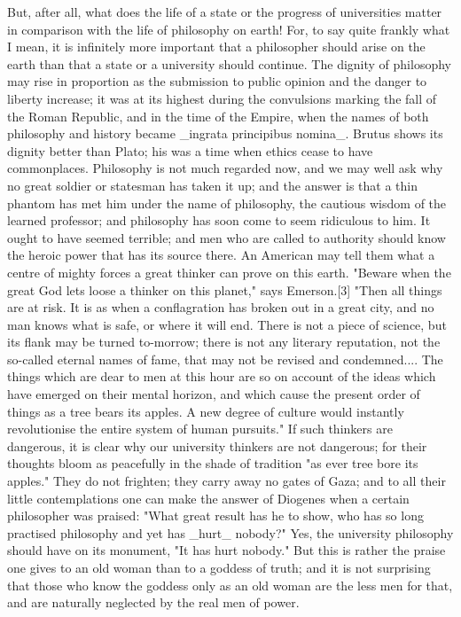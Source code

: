 But, after all, what does the life of a state or the progress of
universities matter in comparison with the life of philosophy on
earth! For, to say quite frankly what I mean, it is infinitely more
important that a philosopher should arise on the earth than that a
state or a university should continue. The dignity of philosophy may
rise in proportion as the submission to public opinion and the danger
to liberty increase; it was at its highest during the convulsions
marking the fall of the Roman Republic, and in the time of the
Empire, when the names of both philosophy and history became _ingrata
principibus nomina_. Brutus shows its dignity better than Plato; his
was a time when ethics cease to have commonplaces. Philosophy is not
much regarded now, and we may well ask why no great soldier or
statesman has taken it up; and the answer is that a thin phantom has
met him under the name of philosophy, the cautious wisdom of the
learned professor; and philosophy has soon come to seem ridiculous to
him. It ought to have seemed terrible; and men who are called to
authority should know the heroic power that has its source there. An
American may tell them what a centre of mighty forces a great thinker
can prove on this earth. "Beware when the great God lets loose a
thinker on this planet," says Emerson.[3] "Then all things are at
risk. It is as when a conflagration has broken out in a great city,
and no man knows what is safe, or where it will end. There is not a
piece of science, but its flank may be turned to-morrow; there is not
any literary reputation, not the so-called eternal names of fame,
that may not be revised and condemned.... The things which are dear
to men at this hour are so on account of the ideas which have emerged
on their mental horizon, and which cause the present order of things
as a tree bears its apples. A new degree of culture would instantly
revolutionise the entire system of human pursuits." If such thinkers
are dangerous, it is clear why our university thinkers are not
dangerous; for their thoughts bloom as peacefully in the shade of
tradition "as ever tree bore its apples." They do not frighten; they
carry away no gates of Gaza; and to all their little contemplations
one can make the answer of Diogenes when a certain philosopher was
praised: "What great result has he to show, who has so long practised
philosophy and yet has _hurt_ nobody?" Yes, the university philosophy
should have on its monument, "It has hurt nobody." But this is rather
the praise one gives to an old woman than to a goddess of truth; and
it is not surprising that those who know the goddess only as an old
woman are the less men for that, and are naturally neglected by the
real men of power.

